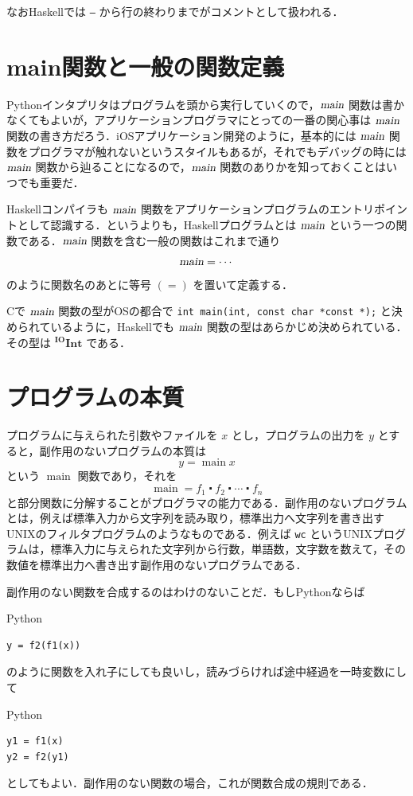 \documentclass[a4paper,twocolumn]{jsbook}
\newcommand{\programminglanguage}[1]{\textsf{#1}}
\newcommand{\clang}{\programminglanguage{C}}
\newcommand{\haskell}{\programminglanguage{Haskell}}
\newcommand{\python}{\programminglanguage{Python}}
\newcommand{\code}[1]{\texttt{#1}}
\newenvironment{pythoncode}{\begin{itembox}[r]{\python}}{\end{itembox}}
\DeclareMathOperator{\mMainFunc}{main}
\newcommand{\mAction}[1]{\textsl{#1}}
\DeclareMathOperator{\mMain}{\mAction{main}}
\DeclareMathOperator{\mComp}{\centerdot}
\newcommand{\mType}[1]{\mathbf{#1}}
\newcommand{\mIntType}{\mType{Int}}
\newcommand{\mIOType}{\mType{IO}}
\newcommand{\mIOIntType}{{}^\mIOType\mIntType}
\begin{document}
なお\haskell では \code{--} から行の終わりまでがコメントとして扱われる．

\section{main関数と一般の関数定義}

\python インタプリタはプログラムを頭から実行していくので，$\mMain$ 関数は書かなくてもよいが，アプリケーションプログラマにとっての一番の関心事は $\mMain$ 関数の書き方だろう．iOSアプリケーション開発のように，基本的には $\mMain$ 関数をプログラマが触れないというスタイルもあるが，それでもデバッグの時には $\mMain$ 関数から辿ることになるので，$\mMain$ 関数のありかを知っておくことはいつでも重要だ．

\haskell コンパイラも $\mMain$ 関数をアプリケーションプログラムのエントリポイントとして認識する．というよりも，\haskell プログラムとは $\mMain$ という一つの関数である．$\mMain$ 関数を含む一般の関数はこれまで通り
\begin{equation}
\mMain=\dotsb
\end{equation}
のように関数名のあとに等号 $(=)$ を置いて定義する．

\clang で $\mMain$ 関数の型がOSの都合で \code{int main(int, const char *const *);} と決められているように，\haskell でも $\mMain$ 関数の型はあらかじめ決められている．その型は $\mIOIntType$ である． 


\section{プログラムの本質}

プログラムに与えられた引数やファイルを $x$ とし，プログラムの出力を $y$ とすると，副作用のないプログラムの本質は
\begin{equation}
y=\mMainFunc x
\end{equation}
という $\mMainFunc$ 関数であり，それを
\begin{equation}
\mMainFunc=f_1\mComp f_2\mComp\dotsb\mComp f_n
\end{equation}
と部分関数に分解することがプログラマの能力である．副作用のないプログラムとは，例えば標準入力から文字列を読み取り，標準出力へ文字列を書き出すUNIXのフィルタプログラムのようなものである．例えば \code{wc} というUNIXプログラムは，標準入力に与えられた文字列から行数，単語数，文字数を数えて，その数値を標準出力へ書き出す副作用のないプログラムである．

副作用のない関数を合成するのはわけのないことだ．もし\python ならば
\begin{pythoncode}
\begin{verbatim}
y = f2(f1(x))
\end{verbatim}
\end{pythoncode}
のように関数を入れ子にしても良いし，読みづらければ途中経過を一時変数にして
\begin{pythoncode}
\begin{verbatim}
y1 = f1(x)
y2 = f2(y1)
\end{verbatim}
\end{pythoncode}
としてもよい．副作用のない関数の場合，これが関数合成の規則である．
\end{document}
